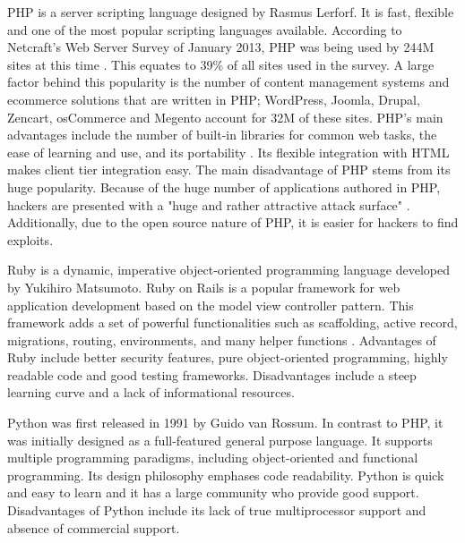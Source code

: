 \documentclass[authoryearcitations]{UoYCSproject}
\begin{document}
PHP is a server scripting language designed by Rasmus Lerforf. It is fast, flexible and one of the most popular scripting languages available. According to Netcraft's Web Server Survey of January 2013, PHP was being used by 244M sites at this time \citep{Ide2013}. This equates to 39\% of all sites used in the survey. A large factor behind this popularity is the number of content management systems and ecommerce solutions that are written in PHP; WordPress, Joomla, Drupal, Zencart, osCommerce and Megento account for 32M of these sites. PHP's main advantages include the number of built-in libraries for common web tasks, the ease of learning and use, and its portability \citep{Welling2005}. Its flexible integration with HTML makes client tier integration easy. The main disadvantage of PHP stems from its huge popularity. Because of the huge number of applications authored in PHP, hackers are presented with a "huge and rather attractive attack surface" \citep{Ide2013}. Additionally, due to the open source nature of PHP, it is easier for hackers to find exploits. 

Ruby is a dynamic, imperative object-oriented programming language developed by Yukihiro Matsumoto. Ruby on Rails is a popular framework for web application development based on the model view controller pattern. This framework adds a set of powerful functionalities such as scaffolding, active record, migrations, routing, environments, and many helper functions \citep{Jazayeri2007}. Advantages of Ruby include better security features, pure object-oriented programming, highly readable code and good testing frameworks. Disadvantages include a steep learning curve and a lack of informational resources.

Python was first released in 1991 by Guido van Rossum. In contrast to PHP, it was initially designed as a full-featured general purpose language. It supports multiple programming paradigms, including object-oriented and functional programming. Its design philosophy emphases code readability. Python is quick and easy to learn and it has a large community who provide good support. Disadvantages of Python include its lack of true multiprocessor support and absence of commercial support. 
\end{document}
